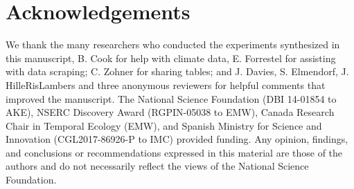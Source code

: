 \documentclass{article}
\begin{document}



\section*{Acknowledgements}
We thank the many researchers who conducted the experiments synthesized in this manuscript, B. Cook for help with climate data, E. Forrestel for assisting with data scraping; C. Zohner for sharing tables; and J. Davies, S. Elmendorf, J. HilleRisLambers and three anonymous reviewers for helpful comments that improved the manuscript. The National Science Foundation (DBI 14-01854 to AKE), NSERC Discovery Award (RGPIN-05038 to EMW), Canada Research Chair in Temporal Ecology (EMW), and Spanish Ministry for Science and Innovation (CGL2017-86926-P to IMC) provided funding. Any opinion, findings, and conclusions or recommendations expressed in this material are those of the authors and do not necessarily reflect the views of the National Science Foundation.
\end{document}
